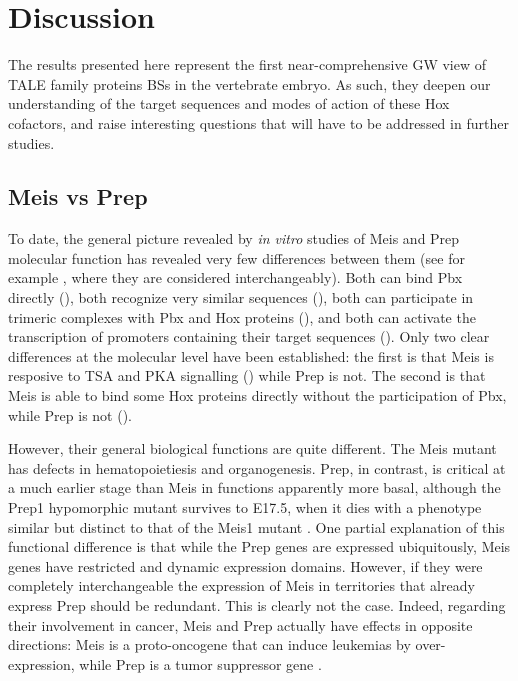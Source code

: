 \chapter{Discussion}
\thispagestyle{cleared}
\cleardoublepage
\label{chp:discussion}

The results presented here represent the first near-comprehensive \ac{GW} view of \ac{TALE} family proteins \acp{BS} in the vertebrate embryo. As such, they deepen our understanding of the target sequences and modes of action of these Hox cofactors, and raise interesting questions that will have to be addressed in further studies. 

\section{Meis vs Prep}

To date, the general picture revealed by \textit{in vitro} studies of Meis and Prep molecular function has revealed very few differences between them (see for example \textcite{Moens2006}, where they are considered interchangeably). Both can bind Pbx directly (\cite{Knoepfler1997, Shen1997}), both recognize very similar sequences (\cite{Knoepfler1997, Chang1997}), both can participate in trimeric complexes with Pbx and Hox proteins (\cite{Berthelsen1998, Shen1999}), and both can activate the transcription of promoters containing their target sequences (\cite{Berthelsen1998, Jacobs1999}). Only two clear differences at the molecular level have been established: the first is that Meis is resposive to \ac{TSA} and \ac{PKA} signalling (\cite{Huang2005}) while Prep is not. The second is that Meis is able to bind some Hox proteins directly without the participation of Pbx, while Prep is not (\cite{Williams2005}).

However, their general biological functions are quite different. The Meis mutant has defects in hematopoietiesis and organogenesis. Prep, in contrast, is critical at a much earlier stage than Meis in functions apparently more basal, although the Prep1 hypomorphic mutant survives to E17.5, when it dies with a phenotype similar but distinct to that of the Meis1 mutant \parencite{Ferretti2006, DiRosa2007}. One partial explanation of this functional difference is that while the Prep genes are expressed ubiquitously, Meis genes have restricted and dynamic expression domains. However, if they were completely interchangeable the expression of Meis in territories that already express Prep should be redundant. This is clearly not the case. Indeed, regarding their involvement in cancer, Meis and Prep actually have effects in opposite directions: Meis is a proto-oncogene that can induce leukemias by over-expression, while Prep is a tumor suppressor gene \parencite{Moskow1995, Thorsteinsdottir2001, Iotti2011, Longobardi2010, Wong2007}. %

